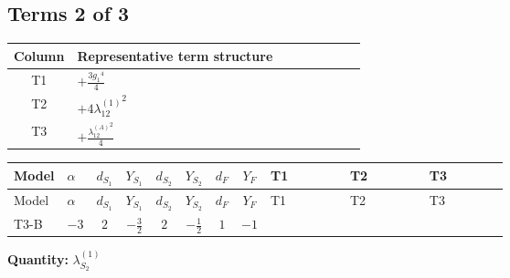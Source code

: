 \documentclass[8pt]{article}
\begin{document}
\begin{landscape}
\subsection*{Terms 2 of 3}
\begin{center}
\begin{tabular}{@{}c >{\raggedright\arraybackslash}p{0.82\linewidth}@{}}
\toprule
Column & Representative term structure \\
\midrule
T1 & \(\displaystyle +\frac{3 {g_1}^4}{4}\) \\
\midrule
T2 & \(\displaystyle +4 {\lambda_{12}^{(1)}}^2\) \\
\midrule
T3 & \(\displaystyle +\frac{{\lambda_{12}^{(A)}}^2}{4}\) \\
\midrule
\bottomrule
\end{tabular}
\end{center}
\smallskip
\tiny
\begin{longtable}{@{}llcccccc >{\raggedright\arraybackslash}p{0.21\linewidth} >{\raggedright\arraybackslash}p{0.21\linewidth} >{\raggedright\arraybackslash}p{0.21\linewidth}@{}}
\toprule
Model & $\alpha$ & $d_{S_1}$ & $Y_{S_1}$ & $d_{S_2}$ & $Y_{S_2}$ & $d_F$ & $Y_F$ & T1 & T2 & T3 \\
\midrule
\endfirsthead
\toprule
Model & $\alpha$ & $d_{S_1}$ & $Y_{S_1}$ & $d_{S_2}$ & $Y_{S_2}$ & $d_F$ & $Y_F$ & T1 & T2 & T3 \\
\midrule
\endhead
T3-B & $-3$ & $2$ & $-\frac{3}{2}$ & $2$ & $-\frac{1}{2}$ & $1$ & $-1$ & \scriptsize\adjustbox{max width=\linewidth}{$\begin{gathered} +\frac{3 {g_1}^4}{4}\end{gathered}$} & \scriptsize\adjustbox{max width=\linewidth}{$\begin{gathered} +4 {\lambda_{12}^{(1)}}^2\end{gathered}$} & \scriptsize\adjustbox{max width=\linewidth}{$\begin{gathered} +\frac{{\lambda_{12}^{(A)}}^2}{4}\end{gathered}$} \\
\midrule
\bottomrule
\end{longtable}
\clearpage
\noindent\textbf{Quantity: }$\lambda_{S_2}^{(1)}$\par\smallskip

\end{landscape}
\end{document}

